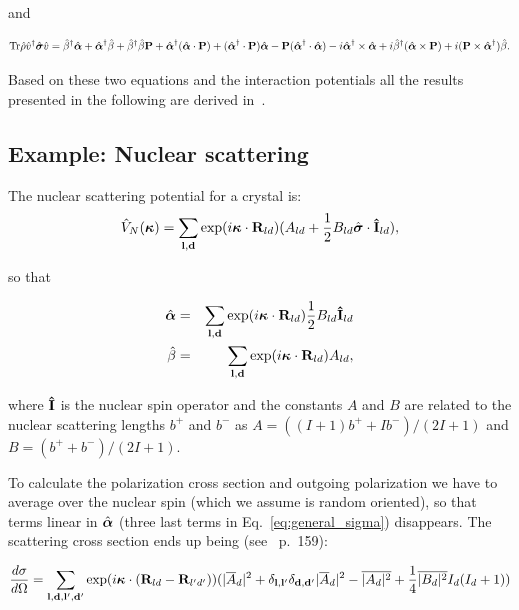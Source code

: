 and 

\begin{equation}
  \label{eq:general_pol}
  \text{Tr} \hat{\rho} \hat{v}^\dagger \hat{\mbox{\boldmath $\sigma$}} \hat{v} =
  \hat{\beta}^\dagger \hat{\mbox{\boldmath $\alpha$}}
  + \hat{\mbox{\boldmath $\alpha$}}^\dagger \hat{\beta}
  + \hat{\beta}^\dagger \hat{\beta} \mathbf{P} 
  + \hat{\mbox{\boldmath $\alpha$}}^\dagger (\hat{\mbox{\boldmath $\alpha$}} \cdot \mathbf{P}) 
  + (\hat{\mbox{\boldmath $\alpha$}}^\dagger \cdot \mathbf{P}) \hat{\mbox{\boldmath $\alpha$}} 
  - \mathbf{P} (\hat{\mbox{\boldmath $\alpha$}}^\dagger \cdot \hat{\mbox{\boldmath $\alpha$}})
  - i \hat{\mbox{\boldmath $\alpha$}}^\dagger \times \hat{\mbox{\boldmath $\alpha$}}
  + i \hat{\beta}^\dagger (\hat{\mbox{\boldmath $\alpha$}} \times \mathbf{P})
  + i (\mathbf{P} \times \hat{\mbox{\boldmath $\alpha$}}^\dagger) \hat{\beta}.
\end{equation}

Based on these two equations and the interaction potentials all the
results presented in the following are derived in~\cite{lovesey}.

\subsection{Example: Nuclear scattering}

The nuclear scattering potential for a crystal is:
\begin{equation}
  \label{eq:nuclear_pot}
  \hat{V}_N(\mathbf{\mbox{\boldmath $\kappa$}}) = \sum_{\mathbf{l},\mathbf{d}} \exp(i\mathbf{\mbox{\boldmath $\kappa$}} \cdot \mathbf{R}_{ld})(A_{ld} + 
  \frac{1}{2} B_{ld} \hat{\mbox{\boldmath $\sigma$}} \cdot \mathbf{\hat{I}}_{ld}),
\end{equation}

so that 

\begin{eqnarray}
  \label{eq:ab_nuclear}
  \hat{\mbox{\boldmath $\alpha$}} & = & 
  \sum_{\mathbf{l},\mathbf{d}} \exp(i\mathbf{\mbox{\boldmath $\kappa$}} \cdot \mathbf{R}_{ld}) \frac{1}{2} B_{ld} \mathbf{\hat{I}}_{ld} \\
  \hat{\beta} & = &
  \sum_{\mathbf{l},\mathbf{d}} \exp(i\mathbf{\mbox{\boldmath $\kappa$}} \cdot \mathbf{R}_{ld}) A_{ld},
\end{eqnarray}

where $\mathbf{\hat{I}}$ is the nuclear spin operator and the constants $A$ and $B$
are related to the nuclear scattering lengths $b^+$ and $b^-$ as
$A=((I+1)b^++Ib^-)/(2I+1)$ and $B=(b^++b^-)/(2I+1)$.

To calculate the polarization cross section and outgoing polarization
we have to average over the nuclear spin (which we assume is random
oriented), so that terms linear in $\hat{\mbox{\boldmath $\alpha$}}$ (three last terms in
Eq.~\ref{eq:general_sigma}) disappears. The scattering cross section
ends up being (see~\cite{lovesey} p.~159):

\begin{equation}
  \label{eq:nuclear_sigma}
  \frac{d\sigma}{d\Omega}  = 
  \sum_{\mathbf{l}, \mathbf{d}, \mathbf{l}', \mathbf{d}'} \exp(i \mathbf{\mbox{\boldmath $\kappa$}} \cdot (\mathbf{R}_{ld}-\mathbf{R}_{l'd'}))
  (|\overline{A}_d|^2 + \delta_{\mathbf{l},\mathbf{l}'}\delta_{\mathbf{d},\mathbf{d}'}|\overline{A}_d|^2 - \overline{|A_d|^2} 
  + \frac{1}{4}\overline{|B_d|^2}I_d(I_d+1))
\end{equation}

